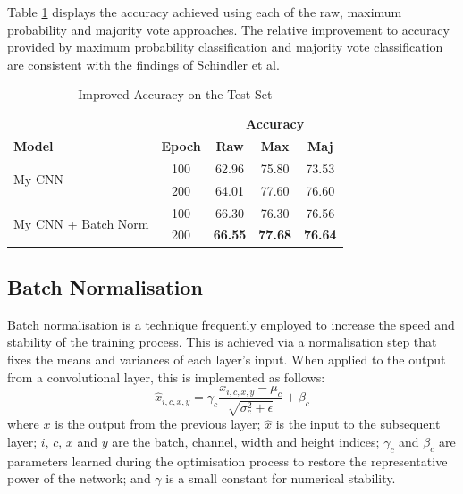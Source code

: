 \documentclass[conference]{IEEEtran}
\begin{document}
Table \ref{improved_results} displays the accuracy achieved using each of the raw, maximum probability and majority vote approaches.
The relative improvement to accuracy provided by maximum probability classification and majority vote classification are consistent with the findings of Schindler et al.

\begin{table}[htbp]
    \caption{Improved Accuracy on the Test Set}
    \begin{center}
    \begin{tabular}{l c c c c}
    \toprule
    &&\multicolumn{3}{c}{\textbf{Accuracy}}\\
    \cmidrule(lr){3-5}
    \textbf{Model}&\textbf{Epoch}&\textbf{Raw}&\textbf{Max}&\textbf{Maj}\\
    \midrule
    \multirow{ 2}{*}{My CNN} & 100 & 62.96 & 75.80 & 73.53 \\
    & 200 & 64.01 & 77.60 & 76.60 \\
    \midrule
    \multirow{ 2}{*}{My CNN + Batch Norm} & 100 & 66.30 & 76.30 & 76.56 \\
    & 200 & \textbf{66.55} & \textbf{77.68} & \textbf{76.64} \\
    \bottomrule
    \end{tabular}
    \label{improved_results}
    \end{center}
\end{table}

\subsection{Batch Normalisation}

Batch normalisation \cite{IoffeSzegedy} is a technique frequently employed to increase the speed and stability of the training process.
This is achieved via a normalisation step that fixes the means and variances of each layer's input.
When applied to the output from a convolutional layer, this is implemented as follows:
\[
\hat{x}_{i,c,x,y}=\gamma_c\frac{x_{i,c,x,y}-\mu_c}{\sqrt{\sigma_c^2+\epsilon}}+\beta_c
\]
where $x$ is the output from the previous layer; $\hat{x}$ is the input to the subsequent layer; $i$, $c$, $x$ and $y$ are the batch, channel, width and height indices; $\gamma_c$ and $\beta_c$ are parameters learned during the optimisation process to restore the representative power of the network; and $\gamma$ is a small constant for numerical stability.
\end{document}
